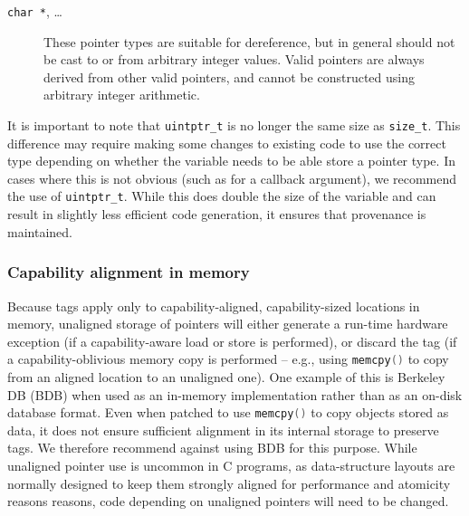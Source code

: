 \documentclass[11pt]{article}
\newcommand{\ccode}[1]{\lstinline[language={C},basicstyle=\small\ttfamily]{#1}}
\newcommand{\cfunc}[1]{\ccode{#1()}}
\newcommand{\uintptr}{\texttt{uintptr\_t}\xspace}
\newcommand{\vaddrt}{\texttt{vaddr\_t}\xspace}
\newcommand{\note}[2]{{\color{blue}[ Note: #1 - #2]}}
\renewcommand{\note}[2]{}
\newcommand{\pgnnote}[1]{\note{#1}{Peter N.}}
\begin{document}
\begin{description}
  \note{The observable, integer range of a \uintptr is the same as
  that of a \vaddrt, despite the increased \emph{alignment} (and,
  ``incidentally,'' \emph{storage}) requirements, yes?}{nwf}

\item[\texttt{char *}, \ldots{}] These pointer types are suitable for
  dereference, but in general should not be cast to or from arbitrary integer
  values.
  Valid pointers are always derived from other valid pointers, and cannot be
  constructed using arbitrary integer arithmetic.
\end{description}

It is important to note that \uintptr is no longer the same size as
\texttt{size\_t}. This difference may require making some changes to
existing code to use the correct type depending on whether the variable
needs to be able store a pointer type. In cases where this is not obvious
(such as for a callback argument), we recommend the use of \uintptr.
While this does double the size of the variable and can result in slightly
less efficient code generation, it ensures that provenance is maintained.

\pgnnote{The above section begs questions relating to what is the
  responsibility of programmers and what can be aided or managed by
  compilers.  Ideally, the latter would be preferable to requiring
  programmers to understand things are are possibly beyond there so-called
  experience.}

\subsubsection{Capability alignment in memory}

Because tags apply only to capability-aligned, capability-sized locations in
memory, unaligned storage of pointers will either generate a run-time
hardware exception (if a capability-aware load or store is performed), or discard the
tag (if a capability-oblivious memory copy is performed -- e.g., using
\cfunc{memcpy} to copy from an aligned location to an unaligned one).
One example of this is Berkeley DB (BDB) when used as an in-memory
implementation rather than as an on-disk database format.
Even when patched to use \cfunc{memcpy} to copy objects stored as data, it
does not ensure sufficient alignment in its internal storage to preserve tags.
We therefore recommend against using BDB for this purpose.
While unaligned pointer use is uncommon in C programs, as data-structure
layouts are normally designed to keep them strongly aligned for performance
and atomicity reasons reasons, code depending on unaligned pointers will need
to be changed.
\end{document}
